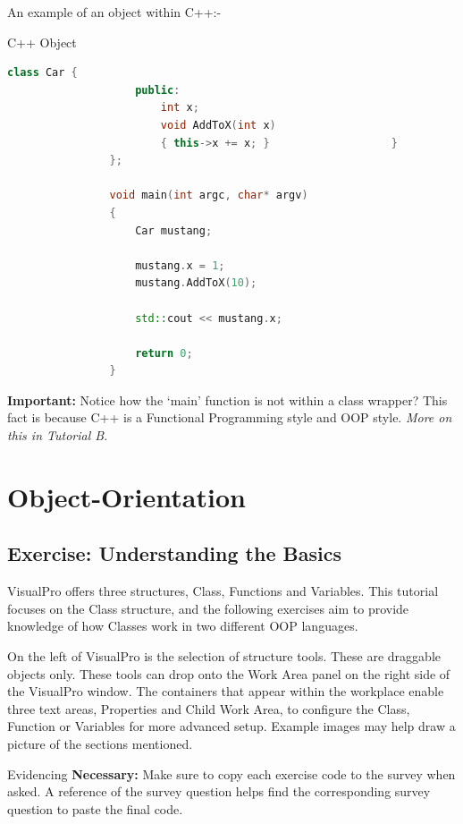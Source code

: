 \documentclass[10pt]{article}
\begin{document}
        \newpage
        An example of an object within C++:-
        \begin{example}{C++ Object}
            \begin{lstlisting}[language=c++]
                class Car {
                    public:
                        int x;
                        void AddToX(int x)
                        { this->x += x; }                   }
                };

                void main(int argc, char* argv)
                {
                    Car mustang;
                    
                    mustang.x = 1;
                    mustang.AddToX(10);
                    
                    std::cout << mustang.x;

                    return 0;
                }
            \end{lstlisting}

            \textbf{Important:} Notice how the `main' function is not within a class wrapper? This fact is because C++ is a Functional Programming style and OOP style. \textit{More on this in Tutorial B.}
        \end{example}
\section{Object-Orientation}
\label{sec:object-orientation}

    \subsection{Exercise: Understanding the Basics}
        VisualPro offers three structures, Class, Functions and Variables. This tutorial focuses on the Class structure, and the following exercises aim to provide knowledge of how Classes work in two different OOP languages.

        On the left of VisualPro is the selection of structure tools. These are draggable objects only. These tools can drop onto the Work Area panel on the right side of the VisualPro window. The containers that appear within the workplace enable three text areas, Properties and Child Work Area, to configure the Class, Function or Variables for more advanced setup. Example images may help draw a picture of the sections mentioned.

        \begin{tip}{Evidencing}
            \textbf{Necessary:} Make sure to copy each exercise code to the survey when asked. A reference of the survey question helps find the corresponding survey question to paste the final code.
        \end{tip}
\end{document}
